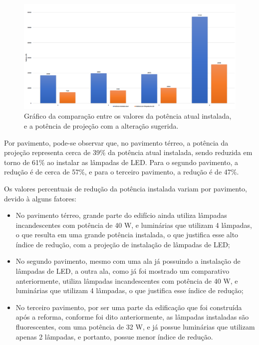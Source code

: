\begin{figure}[H]
\centering
\includegraphics[width = 1.1\textwidth]{Figuras/graph1.PNG}
\caption{Gráfico da comparação entre os valores da potência atual instalada, e a potência de projeção com a alteração sugerida.}
\label{graph1}
\end{figure}


Por pavimento, pode-se observar que, no pavimento térreo, a potência da projeção representa cerca de 39\% da potência atual instalada, sendo reduzida em torno de 61\% ao instalar as lâmpadas de LED. Para o segundo pavimento, a redução é de cerca de 57\%, e para o terceiro pavimento, a redução é de 47\%.

Os valores percentuais de redução da potência instalada variam por pavimento, devido à alguns fatores:
\begin{itemize}
\item No pavimento térreo, grande parte do edifício ainda utiliza lâmpadas incandescentes com potência de 40 W, e luminárias que utilizam 4 lâmpadas, o que resulta em uma grande potência instalada, o que justifica esse alto índice de redução, com a projeção de instalação de lâmpadas de LED;
\item No segundo pavimento, mesmo com uma ala já possuindo a instalação de lâmpadas de LED, a outra ala, como já foi mostrado um comparativo anteriormente, utiliza lâmpadas incandescentes com potência de 40 W, e luminárias que utilizam 4 lâmpadas, o que justifica esse índice de redução;
\item No terceiro pavimento, por ser uma parte da edificação que foi construída após a reforma, conforme foi dito anteriormente, as lâmpadas instaladas são fluorescentes, com uma potência de 32 W, e já possue luminárias que utilizam apenas 2 lâmpadas, e portanto, possue menor índice de redução. 
\end{itemize}


